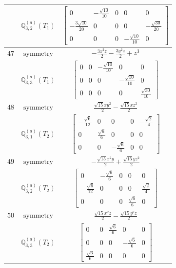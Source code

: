 \documentclass[fleqn,8pt,landscape]{jsarticle}
\begin{document}
\begin{longtable}{ccc}
$  $ & $ \mathbb{Q}_{3,2}^{(a)}(T_{1}) $ & $ \begin{bmatrix} 0 & - \frac{\sqrt{10}}{10} & 0 & 0 & 0 \\ - \frac{3 \sqrt{10}}{20} & 0 & 0 & 0 & - \frac{\sqrt{30}}{20} \\ 0 & 0 & 0 & - \frac{\sqrt{10}}{10} & 0 \end{bmatrix} $ \\ \hline
$ 47 $ & $ \text{symmetry} $ & $ - \frac{3 x^{2} z}{2} - \frac{3 y^{2} z}{2} + z^{3} $ \\
$  $ & $ \mathbb{Q}_{3,3}^{(a)}(T_{1}) $ & $ \begin{bmatrix} 0 & 0 & - \frac{\sqrt{10}}{10} & 0 & 0 \\ 0 & 0 & 0 & - \frac{\sqrt{10}}{10} & 0 \\ 0 & 0 & 0 & 0 & \frac{\sqrt{30}}{10} \end{bmatrix} $ \\ \hline
$ 48 $ & $ \text{symmetry} $ & $ \frac{\sqrt{15} x y^{2}}{2} - \frac{\sqrt{15} x z^{2}}{2} $ \\
$  $ & $ \mathbb{Q}_{3,1}^{(a)}(T_{2}) $ & $ \begin{bmatrix} - \frac{\sqrt{6}}{12} & 0 & 0 & 0 & - \frac{\sqrt{2}}{4} \\ 0 & \frac{\sqrt{6}}{6} & 0 & 0 & 0 \\ 0 & 0 & - \frac{\sqrt{6}}{6} & 0 & 0 \end{bmatrix} $ \\ \hline
$ 49 $ & $ \text{symmetry} $ & $ - \frac{\sqrt{15} x^{2} y}{2} + \frac{\sqrt{15} y z^{2}}{2} $ \\
$  $ & $ \mathbb{Q}_{3,2}^{(a)}(T_{2}) $ & $ \begin{bmatrix} 0 & - \frac{\sqrt{6}}{6} & 0 & 0 & 0 \\ - \frac{\sqrt{6}}{12} & 0 & 0 & 0 & \frac{\sqrt{2}}{4} \\ 0 & 0 & 0 & \frac{\sqrt{6}}{6} & 0 \end{bmatrix} $ \\ \hline
$ 50 $ & $ \text{symmetry} $ & $ \frac{\sqrt{15} x^{2} z}{2} - \frac{\sqrt{15} y^{2} z}{2} $ \\
$  $ & $ \mathbb{Q}_{3,3}^{(a)}(T_{2}) $ & $ \begin{bmatrix} 0 & 0 & \frac{\sqrt{6}}{6} & 0 & 0 \\ 0 & 0 & 0 & - \frac{\sqrt{6}}{6} & 0 \\ \frac{\sqrt{6}}{6} & 0 & 0 & 0 & 0 \end{bmatrix} $ \\ \hline

\end{longtable}
\end{document}
